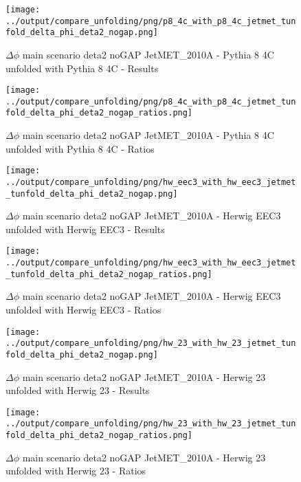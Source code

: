 \documentclass[11pt]{book}
\begin{document}
\begin{figure}[ht]
\centering
\texttt{[image: ../output/compare\_unfolding/png/p8\_4c\_with\_p8\_4c\_jetmet\_tunfold\_delta\_phi\_deta2\_nogap.png]}
\caption{$\Delta\phi$ main scenario deta2 noGAP JetMET\_2010A - Pythia 8 4C unfolded with Pythia 8 4C - Results}
\label{p8_p8_jetmet_tunfold_delta_phi_deta2_nogap_a}
\end{figure}

\begin{figure}[ht]
\centering
\texttt{[image: ../output/compare\_unfolding/png/p8\_4c\_with\_p8\_4c\_jetmet\_tunfold\_delta\_phi\_deta2\_nogap\_ratios.png]}
\caption{$\Delta\phi$ main scenario deta2 noGAP JetMET\_2010A - Pythia 8 4C unfolded with Pythia 8 4C - Ratios}
\label{p8_p8_jetmet_tunfold_delta_phi_deta2_nogap_b}
\end{figure}

\begin{figure}[ht]
\centering
\texttt{[image: ../output/compare\_unfolding/png/hw\_eec3\_with\_hw\_eec3\_jetmet\_tunfold\_delta\_phi\_deta2\_nogap.png]}
\caption{$\Delta\phi$ main scenario deta2 noGAP JetMET\_2010A - Herwig EEC3 unfolded with Herwig EEC3 - Results}
\label{hw_eec3_hw_eec3_jetmet_tunfold_delta_phi_deta2_nogap_a}
\end{figure}

\begin{figure}[ht]
\centering
\texttt{[image: ../output/compare\_unfolding/png/hw\_eec3\_with\_hw\_eec3\_jetmet\_tunfold\_delta\_phi\_deta2\_nogap\_ratios.png]}
\caption{$\Delta\phi$ main scenario deta2 noGAP JetMET\_2010A - Herwig EEC3 unfolded with Herwig EEC3 - Ratios}
\label{hw_eec3_hw_eec3_jetmet_tunfold_delta_phi_deta2_nogap_b}
\end{figure}

\begin{figure}[ht]
\centering
\texttt{[image: ../output/compare\_unfolding/png/hw\_23\_with\_hw\_23\_jetmet\_tunfold\_delta\_phi\_deta2\_nogap.png]}
\caption{$\Delta\phi$ main scenario deta2 noGAP JetMET\_2010A - Herwig 23 unfolded with Herwig 23 - Results}
\label{hw_23_hw_23_jetmet_tunfold_delta_phi_deta2_nogap_a}
\end{figure}

\begin{figure}[ht]
\centering
\texttt{[image: ../output/compare\_unfolding/png/hw\_23\_with\_hw\_23\_jetmet\_tunfold\_delta\_phi\_deta2\_nogap\_ratios.png]}
\caption{$\Delta\phi$ main scenario deta2 noGAP JetMET\_2010A - Herwig 23 unfolded with Herwig 23 - Ratios}
\label{hw_23_hw_23_jetmet_tunfold_delta_phi_deta2_nogap_b}
\end{figure}
\end{document}
